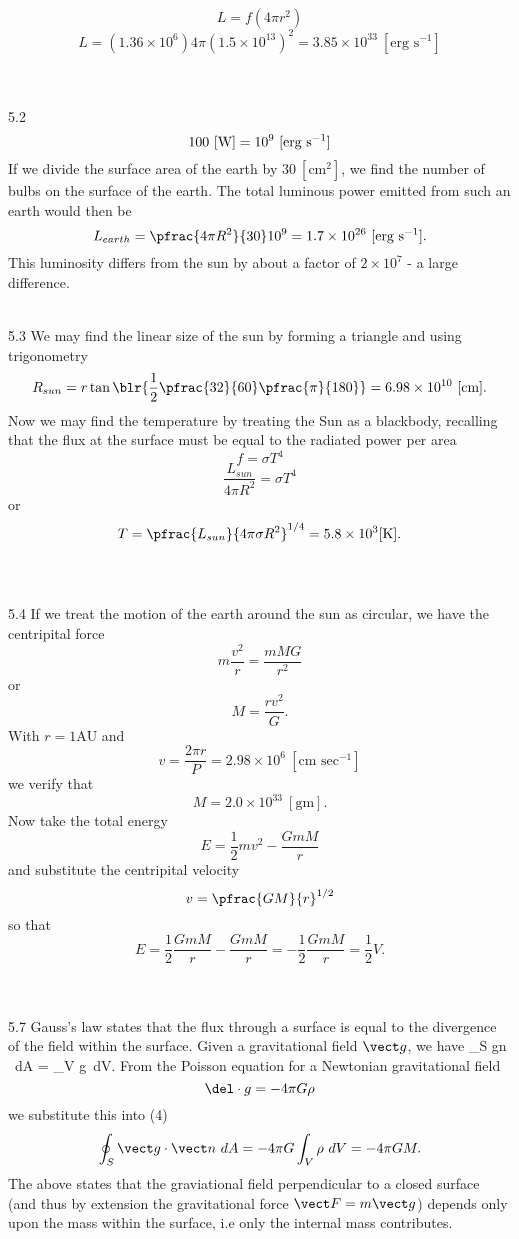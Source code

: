 \documentclass[10pt,letterpaper]{article}
\begin{document}
\[
	L = f(4\pi r^2)
\]
\[
	L = (1.36\times 10^6)4\pi (1.5\times 10^{13})^2=3.85\times 10^{33}\  [\text{erg s}^{-1}]
\]
\\ \\
\item[5.2]
\[
	100\ [\text W] = 10^9\ [\text{erg s}^{-1}]
\]
If we divide the surface area of the earth by $30\ [\text{cm}^2]$, we find the number of bulbs on the surface of the earth. The total luminous power emitted from such an earth would then be
\[
	L_{earth} = \pfrac{4\pi R^2}{30}10^9 = 1.7\times 10^{26}\ [\text{erg s}^{-1}].
\]
This luminosity differs from the sun by about a factor of $2\times 10^{7}$ - a large difference. \\ \\
\item[5.3]
We may find the linear size of the sun by forming a triangle and using trigonometry
\[
	R_{sun} = r \tan\blr{ \frac12\pfrac{32}{60} \pfrac{\pi}{180}} = 6.98\times 10^{10}\ [\text{cm}].
\]
Now we may find the temperature by treating the Sun as a blackbody, recalling that the flux at the surface must be equal to the radiated power per area
\[
	f = \sigma T^4
\]
\[
	\frac{L_{sun}}{4\pi R^2} = \sigma T^4
\]
or 
\[
	T = \pfrac{L_{sun}}{4\pi\sigma R^2}^{1/4} = 5.8\times 10^3 [\text K].
\]
\\ \\
\item[5.4]
If we treat the motion of the earth around the sun as circular, we have the centripital force
\[
	m \frac{v^2}{r} = \frac{mMG}{r^2}
\]
or
\[
	M = \frac{r v^2}{G}.
\]
With $r=1\text{AU}$ and 
\[
	v = \frac{2\pi r}{P} = 2.98\times 10^6\ [\text{cm sec}^{-1}]
\]
we verify that
\[
	M = 2.0 \times 10^{33}\ [\text{gm}].
\]
Now take the total energy 
\[
	E = \frac12 mv^2 - \frac{GmM}{r}
\]
and substitute the centripital velocity
\[
	v = \pfrac{GM}{r}^{1/2}
\]
so that
\[
	E = \frac12 \frac{GmM}{r} - \frac{GmM}{r} = -\frac12 \frac{GmM}{r} = \frac12 V.
\]
\\ \\
\item[5.7]
Gauss's law states that the  flux through a surface is equal to the divergence of the field within the surface. Given a gravitational field $\vect g$, we have
\be
	\oint_S \vect g\cdot \vect n \ dA = \int_V \del\cdot \vect g\ dV.
\ee
From the Poisson equation for a Newtonian gravitational field 
\[
	\del\cdot g = - 4\pi G\rho
\]
we substitute this into (4)
\[
	\oint_S \vect g\cdot \vect n \ dA = -4\pi G \int_V \rho\ dV = -4\pi G M.
\]
The above states that the graviational field perpendicular to a closed surface (and thus by extension the gravitational force $\vect F = m\vect g$) depends only upon the mass within the surface, i.e only the internal mass contributes. 
\end{document}
